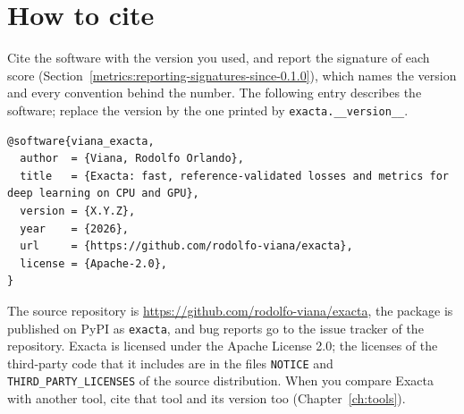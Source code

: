 \chapter{How to cite}\label{ch:citing}

Cite the software with the version you used, and report the signature of each score
(Section~\ref{metrics:reporting-signatures-since-0.1.0}), which names the version and every
convention behind the number. The following entry describes the software; replace the version
by the one printed by \texttt{exacta.\_\_version\_\_}.
\begin{lstlisting}
@software{viana_exacta,
  author  = {Viana, Rodolfo Orlando},
  title   = {Exacta: fast, reference-validated losses and metrics for deep learning on CPU and GPU},
  version = {X.Y.Z},
  year    = {2026},
  url     = {https://github.com/rodolfo-viana/exacta},
  license = {Apache-2.0},
}
\end{lstlisting}
The source repository is \url{https://github.com/rodolfo-viana/exacta}, the package is published
on PyPI as \texttt{exacta}, and bug reports go to the issue tracker of the repository. Exacta
is licensed under the Apache License 2.0; the licenses of the third-party code that it includes
are in the files \texttt{NOTICE} and \texttt{THIRD\_PARTY\_LICENSES} of the source distribution.
When you compare Exacta with another tool, cite that tool and its version too
(Chapter~\ref{ch:tools}).
